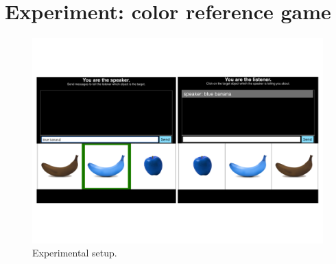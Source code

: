 \documentclass[10pt,letterpaper]{article}
\begin{document}
%
%

\section{Experiment: color reference game}

\begin{figure}[bt!]
	\centering
	\includegraphics[width=.5\textwidth]{graphs/design_0}
	\caption{Experimental setup.
	}
	\label{fig:design_0}
\end{figure}
\end{document}
